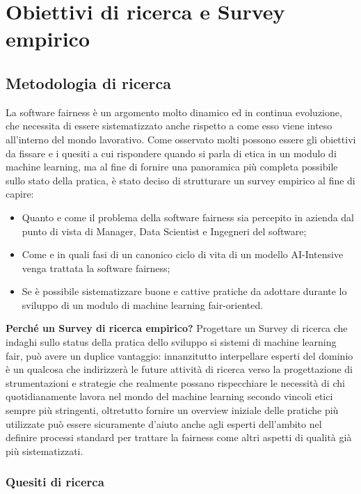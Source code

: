 \chapter{Obiettivi di ricerca e Survey empirico} %
%
    \section{Metodologia di ricerca}
    La software fairness è un argomento molto dinamico ed in continua evoluzione, che necessita di essere sistematizzato anche rispetto a come esso viene inteso all'interno del mondo lavorativo. Come osservato molti possono essere gli obiettivi da fissare e i quesiti a cui rispondere quando si parla di etica in un modulo di machine learning, ma al fine di fornire una panoramica più completa possibile sullo stato della pratica, è stato deciso di strutturare un survey empirico al fine di capire:
    \begin{itemize}
        \item Quanto e come il problema della software fairness sia percepito in azienda dal punto di vista di Manager, Data Scientist e Ingegneri del software;
        \item Come e in quali fasi di un canonico ciclo di vita di un modello AI-Intensive venga trattata la software fairness;
        \item Se è possibile sistematizzare buone e cattive pratiche da adottare durante lo sviluppo di un modulo di machine learning fair-oriented.
    \end{itemize}
    
    \textbf{Perché un Survey di ricerca empirico?}
    Progettare un Survey di ricerca che indaghi sullo status della pratica dello sviluppo si sistemi di machine learning fair, può avere un duplice vantaggio: innanzitutto interpellare esperti del dominio è un qualcosa che indirizzerà le future attività di ricerca verso la progettazione di strumentazioni e strategie che realmente possano rispecchiare le necessità di chi quotidianamente lavora nel mondo del machine learning secondo vincoli etici sempre più stringenti, oltretutto fornire un overview iniziale delle pratiche più utilizzate può essere sicuramente d'aiuto anche agli esperti dell'ambito nel definire processi standard per trattare la fairness come altri aspetti di qualità già più sistematizzati.
  
    \subsection{Quesiti di ricerca}
    

